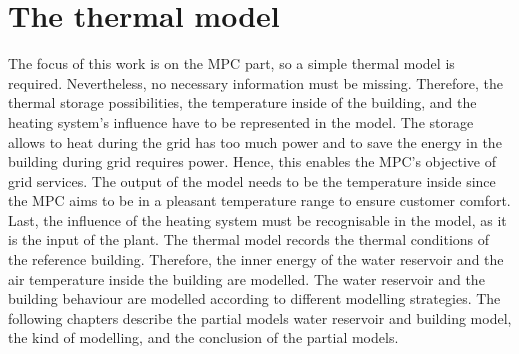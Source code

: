\section{The thermal model}
\label{thermalmodel}
    The focus of this work is on the MPC part, so a simple thermal model is required. Nevertheless, no necessary information must be missing. Therefore, the thermal storage possibilities, the temperature inside of the building, and the heating system's influence have to be represented in the model. The storage allows to heat during the grid has too much power and to save the energy in the building during grid requires power. Hence, this enables the MPC's objective of grid services. The output of the model needs to be the temperature inside since the MPC aims to be in a pleasant temperature range to ensure customer comfort. Last, the influence of the heating system must be recognisable in the model, as it is the input of the plant.
    \newline
    The thermal model records the thermal conditions of the reference building. Therefore, the inner energy of the water reservoir and the air temperature inside the building are modelled. The water reservoir and the building behaviour are modelled according to different modelling strategies. The following chapters describe the partial models water reservoir and building model, the kind of modelling, and the conclusion of the partial models.
    
    
